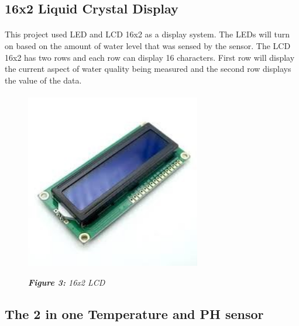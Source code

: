 \documentclass[12pt]{article}
\begin{document}
\subsection*{16x2 Liquid Crystal Display}
\paragraph*{	}
This project used LED and LCD 16x2 as a display system. The LEDs will turn on based on the amount of water level that was sensed by the sensor. The LCD 16x2 has two rows and each row can display 16 characters. First row will display the current aspect of water quality being measured and the second row displays the value of the data.
\newpage
\begin{figure}
\paragraph*{}
\includegraphics[scale=1,height=3in]{lcd.jpg}   %
\begin{center}
\textit{\textbf{Figure 3:} 16x2 LCD } %
\end{center}
\end{figure}

\subsection*{The 2 in one Temperature and PH sensor}
\end{document}
